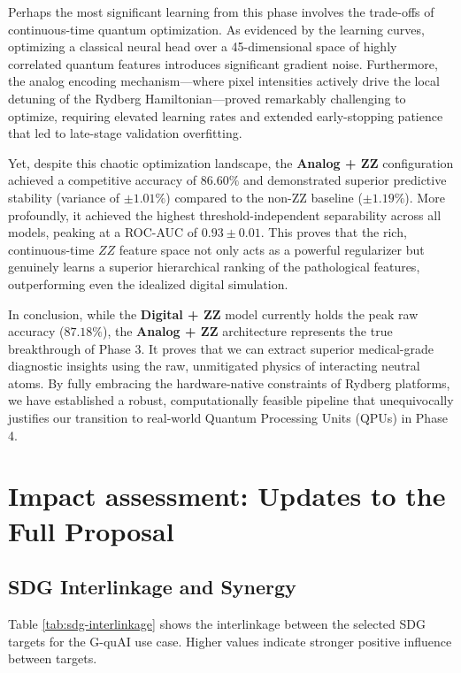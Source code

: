 \documentclass{oqireport}
\begin{document}
Perhaps the most significant learning from this phase involves the trade-offs of continuous-time quantum optimization. As evidenced by the learning curves, optimizing a classical neural head over a 45-dimensional space of highly correlated quantum features introduces significant gradient noise. Furthermore, the analog encoding mechanism---where pixel intensities actively drive the local detuning of the Rydberg Hamiltonian---proved remarkably challenging to optimize, requiring elevated learning rates and extended early-stopping patience that led to late-stage validation overfitting. 

Yet, despite this chaotic optimization landscape, the \textbf{Analog + ZZ} configuration achieved a competitive accuracy of $86.60\%$ and demonstrated superior predictive stability (variance of $\pm 1.01\%$) compared to the non-ZZ baseline ($\pm 1.19\%$). More profoundly, it achieved the highest threshold-independent separability across all models, peaking at a ROC-AUC of $0.93 \pm 0.01$. This proves that the rich, continuous-time $ZZ$ feature space not only acts as a powerful regularizer but genuinely learns a superior hierarchical ranking of the pathological features, outperforming even the idealized digital simulation.

In conclusion, while the \textbf{Digital + ZZ} model currently holds the peak raw accuracy ($87.18\%$), the \textbf{Analog + ZZ} architecture represents the true breakthrough of Phase 3. It proves that we can extract superior medical-grade diagnostic insights using the raw, unmitigated physics of interacting neutral atoms. By fully embracing the hardware-native constraints of Rydberg platforms, we have established a robust, computationally feasible pipeline that unequivocally justifies our transition to real-world Quantum Processing Units (QPUs) in Phase 4.

\section{Impact assessment: Updates to the Full Proposal}
\subsection{SDG Interlinkage and Synergy}
Table \ref{tab:sdg-interlinkage} shows the interlinkage between the selected SDG targets for the G-quAI use case. Higher values indicate stronger positive influence between targets.
\end{document}
